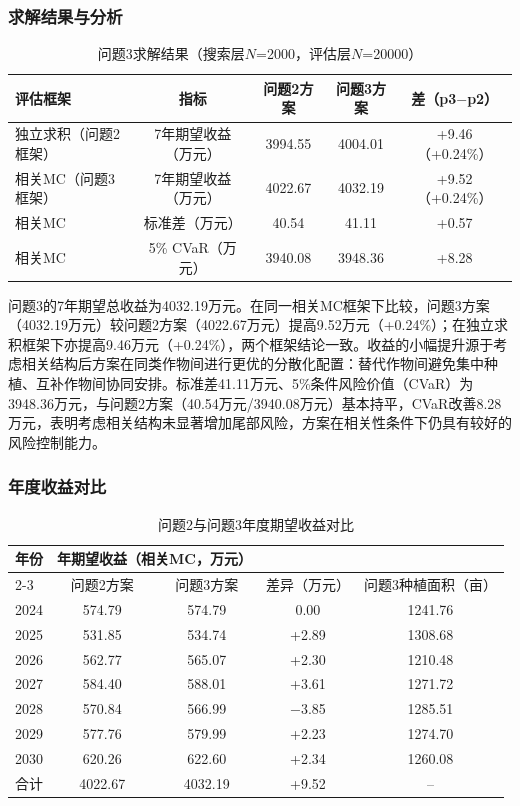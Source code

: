 \documentclass[12pt,a4paper]{article}
\begin{document}
\subsubsection{求解结果与分析}

\begin{table}[H]
\centering
\caption{问题3求解结果（搜索层$N$=2000，评估层$N$=20000）}
\label{tab:q3}
\footnotesize
\setlength{\tabcolsep}{4pt}
\begin{tabular}{lcccc}
\toprule
评估框架 & 指标 & 问题2方案 & 问题3方案 & 差（p3$-$p2） \\
\midrule
独立求积（问题2框架） & 7年期望收益（万元） & 3994.55 & 4004.01 & +9.46（+0.24\%） \\
相关MC（问题3框架） & 7年期望收益（万元） & 4022.67 & 4032.19 & +9.52（+0.24\%） \\
相关MC & 标准差（万元） & 40.54 & 41.11 & +0.57 \\
相关MC & 5\% CVaR（万元） & 3940.08 & 3948.36 & +8.28 \\
\bottomrule
\end{tabular}
\end{table}

问题3的7年期望总收益为4032.19万元。在同一相关MC框架下比较，问题3方案（4032.19万元）较问题2方案（4022.67万元）提高9.52万元（+0.24\%）；在独立求积框架下亦提高9.46万元（+0.24\%），两个框架结论一致。收益的小幅提升源于考虑相关结构后方案在同类作物间进行更优的分散化配置：替代作物间避免集中种植、互补作物间协同安排。标准差41.11万元、5\%条件风险价值（CVaR）为3948.36万元，与问题2方案（40.54万元/3940.08万元）基本持平，CVaR改善8.28万元，表明考虑相关结构未显著增加尾部风险，方案在相关性条件下仍具有较好的风险控制能力。

\subsubsection{年度收益对比}

\begin{table}[H]
\centering
\caption{问题2与问题3年度期望收益对比}
\label{tab:q3year}
\begin{tabular}{lcccc}
\toprule
年份 & \multicolumn{2}{c}{年期望收益（相关MC，万元）} & & \\
\cmidrule(lr){2-3}
 & 问题2方案 & 问题3方案 & 差异（万元） & 问题3种植面积（亩） \\
\midrule
2024 & 574.79 & 574.79 & 0.00 & 1241.76 \\
2025 & 531.85 & 534.74 & +2.89 & 1308.68 \\
2026 & 562.77 & 565.07 & +2.30 & 1210.48 \\
2027 & 584.40 & 588.01 & +3.61 & 1271.72 \\
2028 & 570.84 & 566.99 & $-$3.85 & 1285.51 \\
2029 & 577.76 & 579.99 & +2.23 & 1274.70 \\
2030 & 620.26 & 622.60 & +2.34 & 1260.08 \\
\midrule
合计 & 4022.67 & 4032.19 & +9.52 & -- \\
\bottomrule
\end{tabular}
\end{table}
\end{document}
